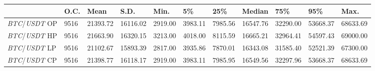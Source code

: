 \begin{tabular}{lllllllllll}
\toprule
 & \textbf{O.C.} & \textbf{Mean} & \textbf{S.D.} & \textbf{Min.} & \textbf{5\%} & \textbf{25\%} & \textbf{Median} & \textbf{75\%} & \textbf{95\%} & \textbf{Max.} \\
\midrule
\emph{BTC}/\emph{USDT} OP & 9516 & 21393.72 & 16116.02 & 2919.00 & 3983.11 & 7985.56 & 16547.76 & 32290.00 & 53668.37 & 68633.69 \\
\emph{BTC}/\emph{USDT} HP & 9516 & 21663.90 & 16320.15 & 3213.00 & 4018.00 & 8115.59 & 16665.21 & 32964.41 & 54597.43 & 69000.00 \\
\emph{BTC}/\emph{USDT} LP & 9516 & 21102.67 & 15893.39 & 2817.00 & 3935.86 & 7870.01 & 16343.08 & 31585.40 & 52521.39 & 67300.00 \\
\emph{BTC}/\emph{USDT} CP & 9516 & 21398.77 & 16118.17 & 2919.00 & 3983.11 & 7985.95 & 16549.56 & 32297.96 & 53668.37 & 68633.69 \\
\bottomrule
\end{tabular}
